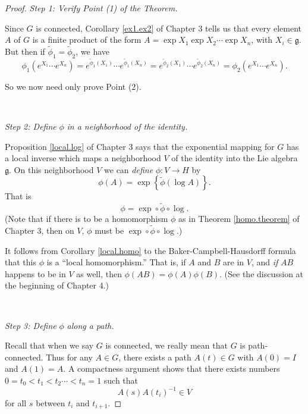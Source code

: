 \documentclass[12pt]{amsbook}
\let \frak = \mathfrak
\theoremstyle{plain}
\numberwithin{equation}{chapter}
\numberwithin{theorem}{chapter}
\begin{document}
\begin{proof}
\textit{Step 1: Verify Point (1) of the Theorem.}

Since $G$ is connected, Corollary \ref{ex1.ex2} of Chapter 3 tells us that
every element $A$ of $G$ is a finite product of the form $A=\exp X_{1}\exp
X_{2}\cdots\exp X_{n}$, with $X_{i}\in\frak{g}$. But then if $\widetilde{\phi
}_{1}=\widetilde{\phi}_{2}$, we have
\[
\phi_{1}\left(  e^{X_{1}}\cdots e^{X_{n}}\right)  =e^{\widetilde{\phi}%
_{1}(X_{1})}\cdots e^{\widetilde{\phi}_{1}(X_{n})}=e^{\widetilde{\phi}%
_{2}(X_{1})}\cdots e^{\widetilde{\phi}_{2}(X_{n})}=\phi_{2}\left(  e^{X_{1}%
}\cdots e^{X_{n}}\right)  \text{.}%
\]

So we now need only prove Point (2).

\ 

\textit{Step 2: Define }$\phi$ \textit{in a neighborhood of the identity.}

Proposition \ref{local.log} of Chapter 3 says that the exponential mapping for
$G$ has a local inverse which maps a neighborhood $V$ of the identity into the
Lie algebra $\frak{g}$. On this neighborhood $V$ we can \textit{define}
$\phi:V\rightarrow H$ by
\[
\phi(A)=\exp\left\{  \widetilde{\phi}(\log A)\right\}  \text{.}%
\]
That is
\[
\phi=\exp\circ\widetilde{\phi}\circ\log\text{.}%
\]
(Note that if there is to be a homomorphism $\phi$ as in Theorem
\ref{homo.theorem} of Chapter 3, then on $V$, $\phi$ must be $\exp
\circ\widetilde{\phi}\circ\log$.)

It follows from Corollary \ref{local.homo} to the Baker-Campbell-Hausdorff
formula that this $\phi$ is a ``local homomorphism.'' That is, if $A$ and $B$
are in $V$, and \textit{if} $AB$ happens to be in $V$ as well, then
$\phi(AB)=\phi(A)\phi(B)$. (See the discussion at the beginning of Chapter 4.)

\ 

\textit{Step 3: Define }$\phi$ \textit{along a path.}

Recall that when we say $G$ is connected, we really mean that $G$ is
path-connected. Thus for any $A\in G$, there exists a path $A(t)\in G$ with
$A(0)=I$ and $A(1)=A$. A compactness argument shows that there exists numbers
$0=t_{0}<t_{1}<t_{2}\cdots<t_{n}=1$ such that
\begin{equation}
A(s)A(t_{i})^{-1}\in V\label{ratio}%
\end{equation}
for all $s$ between $t_{i}$ and $t_{i+1}$.


\end{proof}
\end{document}
